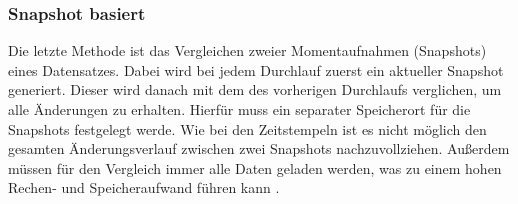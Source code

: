 \subsubsection{Snapshot basiert}
Die letzte Methode ist das Vergleichen zweier Momentaufnahmen (Snapshots) eines Datensatzes.
Dabei wird bei jedem Durchlauf zuerst ein aktueller Snapshot generiert.
Dieser wird danach mit dem des vorherigen Durchlaufs verglichen, um alle Änderungen zu erhalten.
Hierfür muss ein separater Speicherort für die Snapshots festgelegt werde.
Wie bei den Zeitstempeln ist es nicht möglich den gesamten Änderungsverlauf zwischen zwei Snapshots nachzuvollziehen.
Außerdem müssen für den Vergleich immer alle Daten geladen werden, was zu einem hohen Rechen- und Speicheraufwand führen kann \cite{cdc_in_nosql}.




